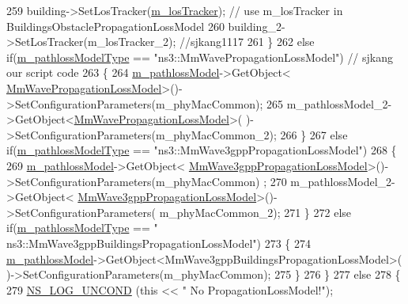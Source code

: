 \begin{DoxyCode}
259                         building->SetLosTracker(\hyperlink{classns3_1_1MmWaveHelper_af8d5d3767371b17c144a0bea7e92af44}{m\_losTracker}); \textcolor{comment}{// use m\_losTracker in
       BuildingsObstaclePropagationLossModel}
260                         building\_2->SetLosTracker(m\_losTracker\_2); \textcolor{comment}{//sjkang1117}
261                 \}
262                 \textcolor{keywordflow}{else} \textcolor{keywordflow}{if}(\hyperlink{classns3_1_1MmWaveHelper_a7f17e9bc4797b51d9a31d16c7e667960}{m\_pathlossModelType} == \textcolor{stringliteral}{"ns3::MmWavePropagationLossModel"}) \textcolor{comment}{//
      sjkang our script code}
263                 \{
264                         \hyperlink{classns3_1_1MmWaveHelper_a4de60027f5a256fe51033e6d6803e9b0}{m\_pathlossModel}->GetObject<
      \hyperlink{classMmWavePropagationLossModel}{MmWavePropagationLossModel}>()->SetConfigurationParameters(m\_phyMacCommon);
265                         m\_pathlossModel\_2->GetObject<\hyperlink{classMmWavePropagationLossModel}{MmWavePropagationLossModel}>(
      )->SetConfigurationParameters(m\_phyMacCommon\_2);
266                 \}
267                 \textcolor{keywordflow}{else} \textcolor{keywordflow}{if}(\hyperlink{classns3_1_1MmWaveHelper_a7f17e9bc4797b51d9a31d16c7e667960}{m\_pathlossModelType} == \textcolor{stringliteral}{"ns3::MmWave3gppPropagationLossModel"})
268                 \{
269                         \hyperlink{classns3_1_1MmWaveHelper_a4de60027f5a256fe51033e6d6803e9b0}{m\_pathlossModel}->GetObject<
      \hyperlink{classMmWave3gppPropagationLossModel}{MmWave3gppPropagationLossModel}>()->SetConfigurationParameters(m\_phyMacCommon)
      ;
270                         m\_pathlossModel\_2->GetObject<
      \hyperlink{classMmWave3gppPropagationLossModel}{MmWave3gppPropagationLossModel}>()->SetConfigurationParameters(
      m\_phyMacCommon\_2);
271                 \}
272                 \textcolor{keywordflow}{else} \textcolor{keywordflow}{if}(\hyperlink{classns3_1_1MmWaveHelper_a7f17e9bc4797b51d9a31d16c7e667960}{m\_pathlossModelType} == \textcolor{stringliteral}{"
      ns3::MmWave3gppBuildingsPropagationLossModel"})
273                 \{
274                         \hyperlink{classns3_1_1MmWaveHelper_a4de60027f5a256fe51033e6d6803e9b0}{m\_pathlossModel}->GetObject<MmWave3gppBuildingsPropagationLossModel>(
      )->SetConfigurationParameters(m\_phyMacCommon);
275                 \}
276         \}
277         \textcolor{keywordflow}{else}
278         \{
279                 \hyperlink{log-macros-disabled_8h_a0b36e5e182b37194f85ef1c5e979fb2e}{NS\_LOG\_UNCOND} (\textcolor{keyword}{this} << \textcolor{stringliteral}{" No PropagationLossModel!"});

\end{DoxyCode}
